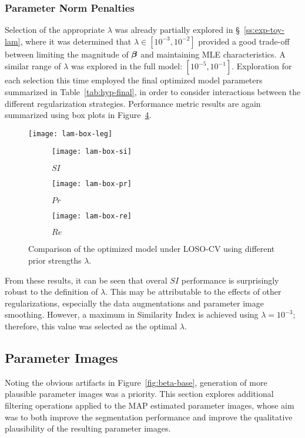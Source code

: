 \subsubsection{Parameter Norm Penalties}\label{sss:exp-lam}
Selection of the appropriate $\lambda$ was already partially explored in \S~\ref{ss:exp-toy-lam},
where it was determined that $\lambda \in [{10}^{-3},{10}^{-2}]$ provided a good trade-off
between limiting the magnitude of $\bm{\beta}$ and maintaining MLE characteristics.
A similar range of $\lambda$ was explored in the full model: $[{10}^{-5},{10}^{-1}]$.
Exploration for each selection this time
employed the final optimized model parameters summarized in Table~\ref{tab:hyp-final},
in order to consider interactions between the different regularization strategies.
Performance metric results are again summarized using box plots in Figure~\ref{fig:seg-box-lam}.
\par
\begin{figure}
  \centering
  \texttt{[image: lam-box-leg]}\\[0.5em]
  \begin{subfigure}{0.32\textwidth}
    \centering\texttt{[image: lam-box-si]}
    \caption{$SI$}%
    \label{fig:seg-box-lam-si}
  \end{subfigure}
  \begin{subfigure}{0.32\textwidth}
    \centering\texttt{[image: lam-box-pr]}
    \caption{$Pr$}%
    \label{fig:seg-box-lam-pr}
  \end{subfigure}
  \begin{subfigure}{0.32\textwidth}
    \centering\texttt{[image: lam-box-re]}
    \caption{$Re$}%
    \label{fig:seg-box-lam-re}
  \end{subfigure}
  \caption{Comparison of the optimized model under LOSO-CV
    using different prior strengths $\lambda$.}%
  \label{fig:seg-box-lam}
\end{figure}
From these results, it can be seen that overal $SI$ performance
is surprisingly robust to the definition of $\lambda$.
This may be attributable to the effects of other regularizations,
especially the data augmentations and parameter image smoothing.
However, a maximum in Similarity Index is achieved using $\lambda = 10^{-3}$;
therefore, this value was selected as the optimal $\lambda$.
\subsection{Parameter Images}\label{ss:exp-beta}
Noting the obvious artifacts in Figure~\ref{fig:beta-base},
generation of more plausible parameter images was a priority.
This section explores additional filtering operations applied to the
MAP estimated parameter images, whose aim was to both
improve the segmentation performance
and improve the qualitative plausibility of the resulting parameter images.
